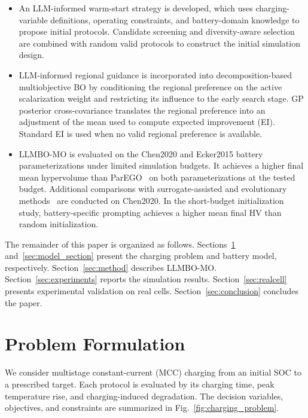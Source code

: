 \documentclass[lettersize,journal]{IEEEtran}
\begin{document}
\begin{itemize}

    \item An LLM-informed warm-start strategy is developed, which uses
    charging-variable definitions, operating constraints, and battery-domain
    knowledge to propose initial protocols. Candidate screening and
    diversity-aware selection are combined with random valid protocols to
    construct the initial simulation design.

    \item LLM-informed regional guidance is incorporated into
    decomposition-based multiobjective BO by conditioning the regional
    preference on the active scalarization weight and restricting its
    influence to the early search stage. GP posterior cross-covariance
    translates the regional preference into an adjustment of the mean used
    to compute expected improvement (EI). Standard EI is used when no
    valid regional preference is available.

    \item LLMBO-MO is evaluated on the Chen2020 and Ecker2015 battery
    parameterizations under limited simulation budgets. It achieves a higher
    final mean hypervolume than ParEGO~\cite{ref4} on both parameterizations
    at the tested budget. Additional comparisons with surrogate-assisted
    and evolutionary methods~\cite{refDISK,refPIMD,refNSGAII} are conducted
    on Chen2020. In the short-budget initialization study, battery-specific
    prompting achieves a higher mean final HV than random initialization.

\end{itemize}

The remainder of this paper is organized as follows.
Sections~\ref{sec:problem} and~\ref{sec:model_section} present the charging
problem and battery model, respectively. Section~\ref{sec:method} describes
LLMBO-MO. Section~\ref{sec:experiments} reports the simulation results.
Section~\ref{sec:realcell} presents experimental validation on real cells.
Section~\ref{sec:conclusion} concludes the paper.

\section{Problem Formulation}
\label{sec:problem}

We consider multistage constant-current (MCC) charging from an initial SOC to
a prescribed target. Each protocol is evaluated by its charging time, peak
temperature rise, and charging-induced degradation. The decision variables,
objectives, and constraints are summarized in
Fig.~\ref{fig:charging_problem}.
\end{document}
